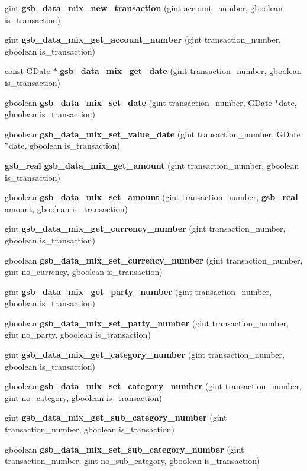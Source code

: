 \begin{DoxyCompactItemize}
\item 
gint {\bf gsb\_\-data\_\-mix\_\-new\_\-transaction} (gint account\_\-number, gboolean is\_\-transaction)
\item 
gint {\bf gsb\_\-data\_\-mix\_\-get\_\-account\_\-number} (gint transaction\_\-number, gboolean is\_\-transaction)
\item 
const GDate $\ast$ {\bf gsb\_\-data\_\-mix\_\-get\_\-date} (gint transaction\_\-number, gboolean is\_\-transaction)
\item 
gboolean {\bf gsb\_\-data\_\-mix\_\-set\_\-date} (gint transaction\_\-number, GDate $\ast$date, gboolean is\_\-transaction)
\item 
gboolean {\bf gsb\_\-data\_\-mix\_\-set\_\-value\_\-date} (gint transaction\_\-number, GDate $\ast$date, gboolean is\_\-transaction)
\item 
{\bf gsb\_\-real} {\bf gsb\_\-data\_\-mix\_\-get\_\-amount} (gint transaction\_\-number, gboolean is\_\-transaction)
\item 
gboolean {\bf gsb\_\-data\_\-mix\_\-set\_\-amount} (gint transaction\_\-number, {\bf gsb\_\-real} amount, gboolean is\_\-transaction)
\item 
gint {\bf gsb\_\-data\_\-mix\_\-get\_\-currency\_\-number} (gint transaction\_\-number, gboolean is\_\-transaction)
\item 
gboolean {\bf gsb\_\-data\_\-mix\_\-set\_\-currency\_\-number} (gint transaction\_\-number, gint no\_\-currency, gboolean is\_\-transaction)
\item 
gint {\bf gsb\_\-data\_\-mix\_\-get\_\-party\_\-number} (gint transaction\_\-number, gboolean is\_\-transaction)
\item 
gboolean {\bf gsb\_\-data\_\-mix\_\-set\_\-party\_\-number} (gint transaction\_\-number, gint no\_\-party, gboolean is\_\-transaction)
\item 
gint {\bf gsb\_\-data\_\-mix\_\-get\_\-category\_\-number} (gint transaction\_\-number, gboolean is\_\-transaction)
\item 
gboolean {\bf gsb\_\-data\_\-mix\_\-set\_\-category\_\-number} (gint transaction\_\-number, gint no\_\-category, gboolean is\_\-transaction)
\item 
gint {\bf gsb\_\-data\_\-mix\_\-get\_\-sub\_\-category\_\-number} (gint transaction\_\-number, gboolean is\_\-transaction)
\item 
gboolean {\bf gsb\_\-data\_\-mix\_\-set\_\-sub\_\-category\_\-number} (gint transaction\_\-number, gint no\_\-sub\_\-category, gboolean is\_\-transaction)

\end{DoxyCompactItemize}
